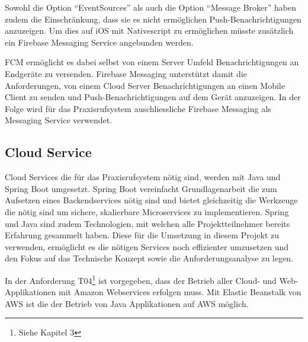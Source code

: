 Sowohl die Option ``EventSources'' als auch die Option ``Message Broker'' haben zudem die Einschränkung, dass sie es nicht ermöglichen Push-Benachrichtigungen anzuzeigen.
Um dies auf iOS mit Nativescript zu ermöglichen müsste zusätzlich ein Firebase Messaging Service angebunden werden.

FCM ermöglicht es dabei selbst von einem Server Umfeld Benachrichtigungen an Endgeräte zu versenden.\cite{fcm-java}
Firebase Messaging unterstützt damit die Anforderungen, von einem Cloud Server Benachrichtigungen an einen Mobile Client zu senden und Push-Benachrichtigungen auf dem Gerät anzuzeigen.
In der Folge wird für das Praxisrufsystem auschliessliche Firebase Messaging als Messaging Service verwendet.

\subsection{Cloud Service}\label{subsec:cloud-service2}

Cloud Services die für das Praxisrufsystem nötig sind, werden mit Java und Spring Boot umgesetzt.
Spring Boot vereinfacht Grundlagenarbeit die zum Aufsetzen eines Backendservices nötig sind und bietet
gleichzeitig die Werkzeuge die nötig sind um sichere, skalierbare Microservices zu implementieren.\cite{why-spring}
Spring und Java sind zudem Technologien, mit welchen alle Projektteilnehmer bereits Erfahrung gesammelt haben.
Diese für die Umsetzung in diesem Projekt zu verwenden, ermöglicht es die nötigen Services noch effizienter umzusetzen
und den Fokus auf das Technische Konzept sowie die Anforderungsanalyse zu legen.

In der Anforderung T04\footnote{Siehe Kapitel 3} ist vorgegeben, dass der Betrieb aller Cloud- und Web-Applikationen mit Amazon Webservices erfolgen muss.
Mit Elastic Beanstalk von AWS ist die der Betrieb von Java Applikationen auf AWS möglich.\cite{aws-spring-java}


